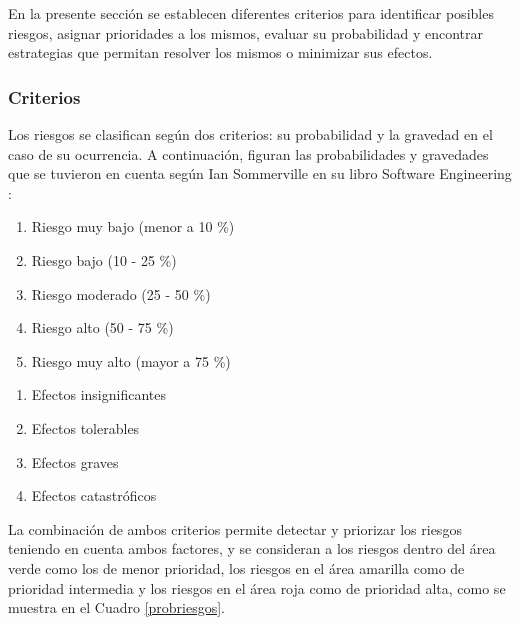 En la presente sección se establecen diferentes criterios para identificar posibles riesgos, asignar prioridades a los mismos, evaluar su probabilidad y encontrar estrategias que permitan resolver los mismos o minimizar sus efectos.


\subsubsection{Criterios}

Los riesgos se clasifican según dos criterios: su probabilidad y la gravedad en el caso de su ocurrencia. A continuación, figuran las probabilidades y gravedades que se tuvieron en cuenta según Ian Sommerville en su libro Software Engineering \cite{sommerville}:

\begin{enumerate}
    \item Riesgo muy bajo (menor a 10 \%)
    \item Riesgo bajo (10 - 25 \%)
    \item Riesgo moderado (25 - 50 \%)
    \item Riesgo alto (50 - 75 \%)
    \item Riesgo muy alto (mayor a 75 \%)
\end{enumerate}

\begin{enumerate}
    \item Efectos insignificantes
    \item Efectos tolerables
    \item Efectos graves
    \item Efectos catastróficos
\end{enumerate}

La combinación de ambos criterios permite detectar y priorizar los riesgos teniendo en cuenta ambos factores, y se consideran a los riesgos dentro del área verde como los de menor prioridad, los riesgos en el área amarilla como de prioridad intermedia y los riesgos en el área roja como de prioridad alta, como se muestra en el Cuadro \ref{probriesgos}.

